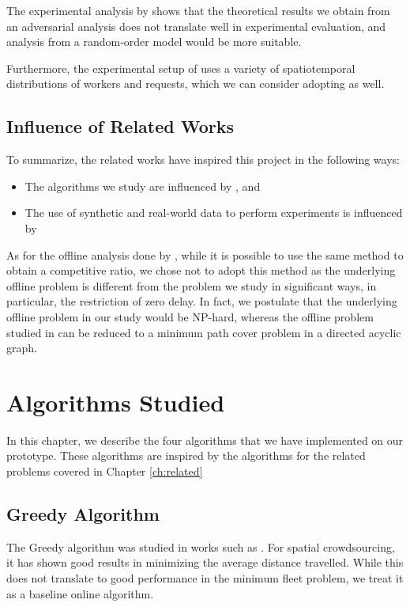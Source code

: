 \documentclass[urop]{socreport}
\begin{document}
The experimental analysis by \cite{tong} shows that the theoretical results we obtain from an adversarial analysis does not translate well in experimental evaluation, and analysis from a random-order model would be more suitable.

Furthermore, the experimental setup of \cite{tong} uses a variety of spatiotemporal distributions of workers and requests, which we can consider adopting as well.

\section{Influence of Related Works}
To summarize, the related works have inspired this project in the following ways:
\begin{itemize}
    \item The algorithms we study are influenced by \cite{karp}, \cite{kazemi} and \cite{cheng}
    \item The use of synthetic and real-world data to perform experiments is influenced by \cite{tong}
\end{itemize}

As for the offline analysis done by \cite{nature}, while it is possible to use the same method to obtain a competitive ratio, we chose not to adopt this method as the underlying offline problem is different from the problem we study in significant ways, in particular, the restriction of zero delay. In fact, we postulate that the underlying offline problem in our study would be NP-hard, whereas the offline problem studied in \cite{nature} can be reduced to a minimum path cover problem in a directed acyclic graph.

\chapter{Algorithms Studied}
\label{ch:algo}

In this chapter, we describe the four algorithms that we have implemented on our prototype. These algorithms are inspired by the algorithms for the related problems covered in Chapter \ref{ch:related}

\section{Greedy Algorithm}
The Greedy algorithm was studied in works such as \cite{kazemi, cheng}. For spatial crowdsourcing, it has shown good results in minimizing the average distance travelled. While this does not translate to good performance in the minimum fleet problem, we treat it as a baseline online algorithm.
\end{document}
